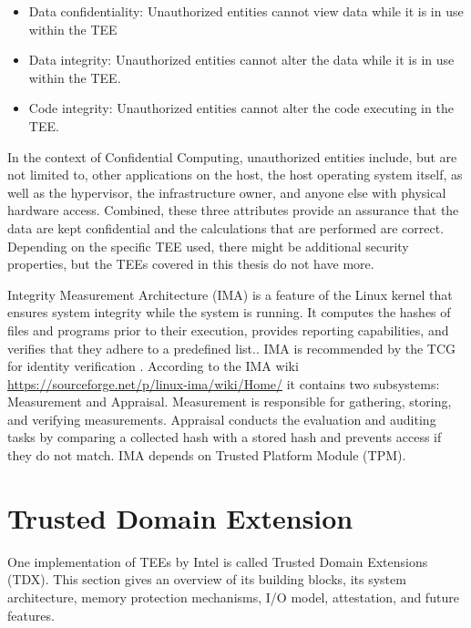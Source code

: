 \begin{itemize} 
    \item \guillemotright Data confidentiality: Unauthorized entities cannot view data while it is in use within the TEE
    \item Data integrity: Unauthorized entities cannot alter the data while it is in use within the TEE.
    \item Code integrity: Unauthorized entities cannot alter the code executing in the TEE.\guillemotleft \cite{noauthor_ccc_outreach_whitepaper_updated_november_2022pdf_2023}
\end{itemize} 
In the context of Confidential Computing, unauthorized entities include, but are not limited to, other applications on the host, the host operating system itself, as well as the hypervisor, the infrastructure owner, and anyone else with physical hardware access. 
Combined, these three attributes provide an assurance that the data are kept confidential and the calculations that are performed are correct.
Depending on the specific TEE used, there might be additional security properties, but the TEEs covered in this thesis do not have more\cite{noauthor_ccc_outreach_whitepaper_updated_november_2022pdf_2023}.

Integrity Measurement Architecture (IMA) is a feature of the Linux kernel that ensures system integrity while the system is running. It computes the hashes of files and programs prior to their execution, provides reporting capabilities, and verifies that they adhere to a predefined list.\cite{Luo_container_ima}. IMA is recommended by the TCG for identity verification \cite{TCG Guidance on Integrity Measurements and Event Log Processing}. According to the IMA wiki \url{https://sourceforge.net/p/linux-ima/wiki/Home/} it contains two subsystems: Measurement and Appraisal. Measurement is responsible for gathering, storing, and verifying measurements. Appraisal conducts the evaluation and auditing tasks by comparing a collected hash with a stored hash and prevents access if they do not match. IMA depends on Trusted Platform Module (TPM)\cite{Luo_container_ima}. 

\section{Trusted Domain Extension}
One implementation of TEEs by Intel is called Trusted Domain Extensions (TDX). This section gives an overview of its building blocks, its system architecture, memory protection mechanisms, I/O model, attestation, and future features.
